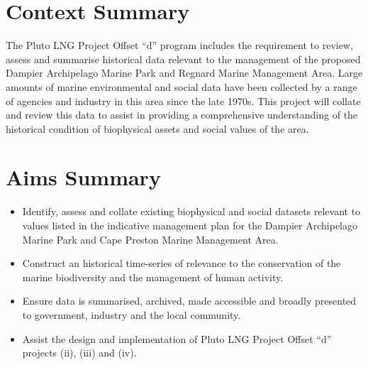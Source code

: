 \documentclass[version=last, paper=a4, DIV=18, usenames, dvipsnames]{scrartcl}
\begin{document}
%

%




\section*{Context Summary}
The Pluto LNG Project Offset ``d'' program includes the requirement to
review, assess and summarise historical data relevant to the management
of the proposed Dampier Archipelago Marine Park and Regnard Marine
Management Area. Large amounts of marine environmental and social data
have been collected by a range of agencies and industry in this area
since the late 1970s. This project will collate and review this data to
assist in providing a comprehensive understanding of the historical
condition of biophysical assets and social values of the area.



\section*{Aims Summary}
\begin{itemize}
\itemsep1pt\parskip0pt
\item
  Identify, assess and collate existing biophysical and social datasets
  relevant to values listed in the indicative management plan for the
  Dampier Archipelago Marine Park and Cape Preston Marine Management
  Area.
\item
  Construct an historical time-series of relevance to the conservation
  of the marine biodiversity and the management of human activity.
\item
  Ensure data is summarised, archived, made accessible and broadly
  presented to government, industry and the local community.
\item
  Assist the design and implementation of Pluto LNG Project Offset ``d''
  projects (ii), (iii) and (iv).
\end{itemize}
\end{document}
